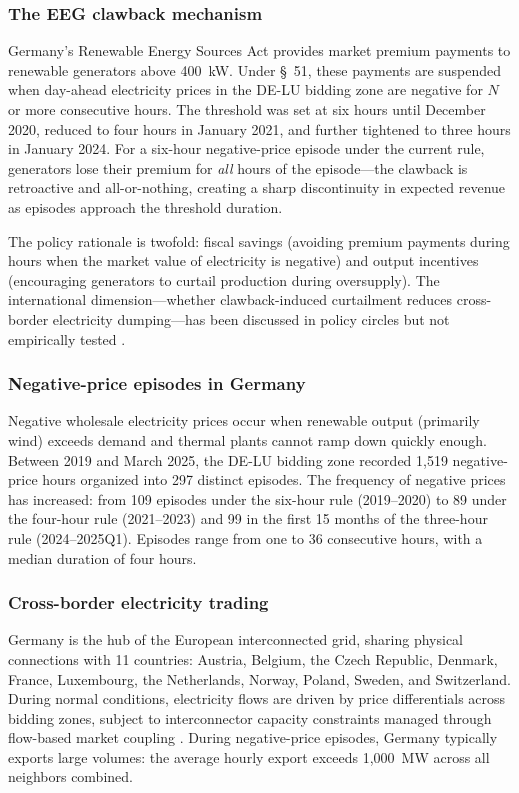 \documentclass[12pt]{article}
\begin{document}
\subsubsection*{The EEG clawback mechanism}
Germany's Renewable Energy Sources Act provides market premium payments to renewable generators above 400~kW. Under \S~51, these payments are suspended when day-ahead electricity prices in the DE-LU bidding zone are negative for $N$ or more consecutive hours. The threshold was set at six hours until December 2020, reduced to four hours in January 2021, and further tightened to three hours in January 2024. For a six-hour negative-price episode under the current rule, generators lose their premium for \textit{all} hours of the episode---the clawback is retroactive and all-or-nothing, creating a sharp discontinuity in expected revenue as episodes approach the threshold duration.

The policy rationale is twofold: fiscal savings (avoiding premium payments during hours when the market value of electricity is negative) and output incentives (encouraging generators to curtail production during oversupply). The international dimension---whether clawback-induced curtailment reduces cross-border electricity dumping---has been discussed in policy circles but not empirically tested \citep{acer2020negative}.

\subsubsection*{Negative-price episodes in Germany}
Negative wholesale electricity prices occur when renewable output (primarily wind) exceeds demand and thermal plants cannot ramp down quickly enough. Between 2019 and March 2025, the DE-LU bidding zone recorded 1,519 negative-price hours organized into 297 distinct episodes. The frequency of negative prices has increased: from 109 episodes under the six-hour rule (2019--2020) to 89 under the four-hour rule (2021--2023) and 99 in the first 15 months of the three-hour rule (2024--2025Q1). Episodes range from one to 36 consecutive hours, with a median duration of four hours.

\subsubsection*{Cross-border electricity trading}
Germany is the hub of the European interconnected grid, sharing physical connections with 11 countries: Austria, Belgium, the Czech Republic, Denmark, France, Luxembourg, the Netherlands, Norway, Poland, Sweden, and Switzerland. During normal conditions, electricity flows are driven by price differentials across bidding zones, subject to interconnector capacity constraints managed through flow-based market coupling \citep{newbery2016benefits}. During negative-price episodes, Germany typically exports large volumes: the average hourly export exceeds 1,000~MW across all neighbors combined.
\end{document}
